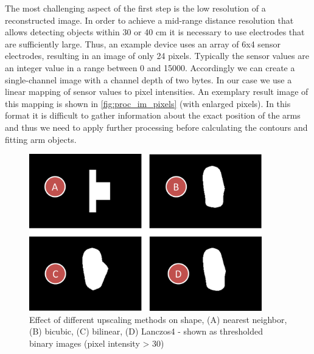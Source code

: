 The most challenging aspect of the first step is the low resolution of a reconstructed image. In order to achieve a mid-range distance resolution that allows detecting objects within 30 or 40 cm it is necessary to use electrodes that are sufficiently large. Thus, an example device uses an array of 6x4 sensor electrodes, resulting in an image of only 24 pixels. Typically the sensor values are an integer value in a range between 0 and 15000. Accordingly we can create a single-channel image with a channel depth of two bytes. In our case we use a linear mapping of sensor values to pixel intensities. An exemplary result image of this mapping is shown in \ref{fig:proc_im_pixels} (with enlarged pixels). In this format it is difficult to gather information about the exact position of the arms and thus we need to apply further processing before calculating the contours and fitting arm objects.
\begin{figure}[h]
\centering
\includegraphics[width=0.9\textwidth]{images/proc_im_interpol}
\caption{Effect of different upscaling methods on shape, (A) nearest neighbor, (B) bicubic, (C) bilinear, (D) Lanczos4 - shown as thresholded binary images (pixel intensity > 30)}
\label{fig:proc_im_interpol}
\end{figure}

